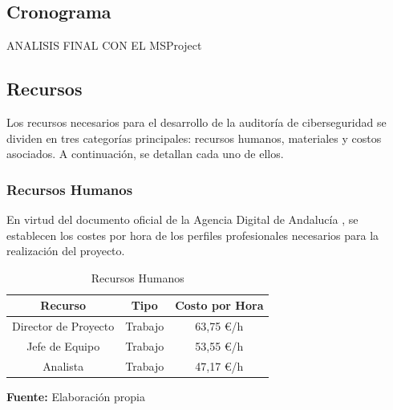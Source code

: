 \documentclass[a4paper, 10pt]{article}
\begin{document}
\subsection{Cronograma}
ANALISIS FINAL CON EL MSProject

\subsection{Recursos}

Los recursos necesarios para el desarrollo de la auditoría de ciberseguridad se dividen en tres categorías principales: recursos humanos, materiales y costos asociados. A continuación, se detallan cada uno de ellos.

\subsubsection{Recursos Humanos}

En virtud del documento oficial de la Agencia Digital de Andalucía \cite{agencia_digital}, se establecen los costes por hora de los perfiles profesionales necesarios para la realización del proyecto.

\begin{table}[H]
\caption{Recursos Humanos}
\centering
\renewcommand{\arraystretch}{1.5}
\begin{tabular}{|c|c|c|}
\hline
\textbf{Recurso} & \textbf{Tipo} & \textbf{Costo por Hora}  \\ \hline
Director de Proyecto & Trabajo & 63,75 €/h  \\ \hline
Jefe de Equipo & Trabajo & 53,55 €/h  \\ \hline
Analista & Trabajo & 47,17 €/h  \\ \hline
\end{tabular}
\begin{flushleft}\centering
    \footnotesize \textbf{Fuente:} Elaboración propia
\end{flushleft}   
\label{tab:recursos_humanos}
\end{table}
\end{document}
